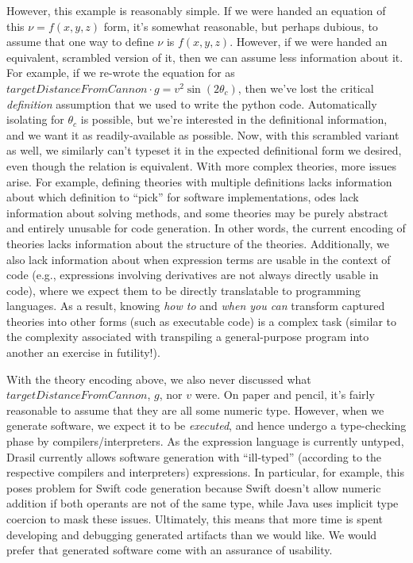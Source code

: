However, this example is reasonably simple. If we were handed an equation of
this \(\nu{} = f(x,y,z)\) form, it's somewhat reasonable, but perhaps dubious,
to assume that one way to define \(\nu{}\) is \(f(x,y,z)\). However, if we were
handed an equivalent, scrambled version of it, then we can assume less
information about it. For example, if we re-wrote the equation for
 as \(\mathit{targetDistanceFromCannon}
\cdot{} g = v^2\sin{}(2\theta{}_c)\), then we've lost the critical
\textit{definition} assumption that we used to write the python code.
Automatically isolating for \(\theta_c\) is possible, but we're interested in
the definitional information, and we want it as readily-available as possible.
Now, with this scrambled variant as well, we similarly can't typeset it in the
expected definitional form we desired, even though the relation is equivalent.
With more complex theories, more issues arise. For example, defining theories
with multiple definitions lacks information about which definition to ``pick''
for software implementations, \acsp{ode} lack information about solving methods,
and some theories may be purely abstract and entirely unusable for code
generation. In other words, the current encoding of theories lacks information
about the structure of the theories. Additionally, we also lack information
about when expression terms are usable in the context of code (e.g., expressions
involving derivatives are not always directly usable in code), where we expect
them to be directly translatable to programming languages. As a result, knowing
\textit{how to} and \textit{when you can} transform captured theories into other
forms (such as executable code) is a complex task (similar to the complexity
associated with transpiling a general-purpose program into another \textemdash{}
an exercise in futility!).

With the theory encoding above, we also never discussed what
\(\mathit{targetDistanceFromCannon}\), \(g\), nor \(v\) were. On paper and
pencil, it's fairly reasonable to assume that they are all some numeric type.
However, when we generate software, we expect it to be \textit{executed}, and
hence undergo a type-checking phase by compilers/interpreters. As the expression
language is currently untyped, Drasil currently allows software generation with
``ill-typed'' (according to the respective compilers and interpreters)
expressions. In particular, for example, this poses problem for Swift code
generation because Swift doesn't allow numeric addition if both operants are not
of the same type, while Java uses implicit type coercion to mask these issues.
Ultimately, this means that more time is spent developing and debugging
generated artifacts than we would like. We would prefer that generated software
come with an assurance of usability.

